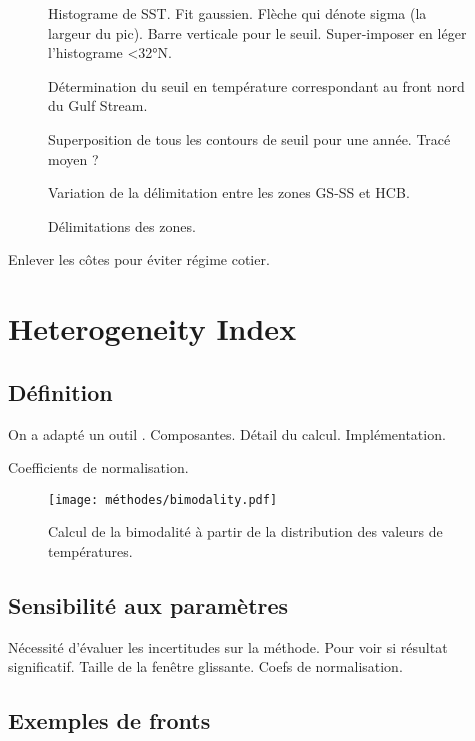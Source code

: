 \documentclass[index]{subfiles}
\begin{document}
\begin{figure}
  Histograme de SST. Fit gaussien. Flèche qui dénote sigma (la largeur du pic).
  Barre verticale pour le seuil.
  Super-imposer en léger l'histograme <32°N.
  \caption{Détermination du seuil en température correspondant au front nord du Gulf Stream.}
  \label{fig:seuil-temp}
\end{figure}


\begin{figure}
  Superposition de tous les contours de seuil pour une année.
  Tracé moyen ?
  \caption{Variation de la délimitation entre les zones GS-SS et HCB.}
  \label{fig:var-delim}
\end{figure}


\begin{figure}
  \caption{Délimitations des zones.}
  \label{fig:zone-delimitation}
\end{figure}

Enlever les côtes pour éviter régime cotier.

\section{Heterogeneity Index}
\subsection{Définition}

On a adapté un outil \parencite{liu_2016}.
Composantes.
Détail du calcul.
Implémentation.

Coefficients de normalisation.

\begin{figure}
  \centering
  \texttt{[image: méthodes/bimodality.pdf]}
  \caption[Calcul de la bimodalité]{Calcul de la bimodalité à partir de la distribution des valeurs de températures.}
  \label{fig:bimodality}
\end{figure}

\subsection{Sensibilité aux paramètres}

Nécessité d'évaluer les incertitudes sur la méthode.
Pour voir si résultat significatif.
Taille de la fenêtre glissante. Coefs de normalisation.

\subsection{Exemples de fronts}
\end{document}
